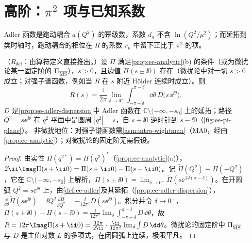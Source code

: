 \section{高阶：$\pi^2$ 项与已知系数}\label{sec:ee-higher}

Adler 函数是跑动耦合 $a(Q^2)$ 的幂级数，系数 $d_n$ 不含 $\ln(Q^2/\mu^2)$；而延拓到类时轴时，跑动耦合的相位在 $R$ 的系数 $r_n$ 中留下正比于 $\pi^2$ 的项。

\begin{proposition}\label{prop:ee-contour}
（$R_{\mathrm{def}}$：由算符定义直接推出。）设 $\Pi$ 满足\cref{prop:ee-analytic}(b) 的条件（或为微扰论某一固定阶的 $\Pi_{\overline{\rm MS}}$），$s>0$，且边值 $\Pi(s\pm\ii0)$ 存在（微扰论中对一切 $s>0$ 成立；对强子谱函数，例如当 $R$ 在 $s$ 附近 Hölder 连续时成立）。则
\begin{equation}\label{eq:ee-contour}
R(s)=\frac1{2\pi}\lim_{\delta\to0^+}\int_{-\pi+\delta}^{\pi-\delta}\!\dd\theta\,D\big(s\,\ee^{\ii\theta}\big),
\end{equation}
$D$ 是\cref{prop:ee-adler-dispersion}中 Adler 函数在 $\mathbb C\setminus(-\infty,-s_0]$ 上的延拓；路径 $Q^2=s\ee^{\ii\theta}$ 在 $q^2$ 平面中是圆周 $|q^2|=s$，自 $s+\ii0$ 逆时针到 $s-\ii0$（\cref{fig:ee-pi-plane}）。
非微扰地位：对强子谱函数需\cref{asm:intro-wightman}（MA0，经由\cref{prop:ee-analytic}）；对微扰论的固定阶无需假设。
\end{proposition}
\begin{proof}
由实性 $\Pi(q^{2*})=\Pi(q^2)^*$（\cref{prop:ee-analytic}(a)），$2\ii\Imag\Pi(s+\ii0)=\Pi(s+\ii0)-\Pi(s-\ii0)$。记 $\tilde\Pi(Q^2)\equiv\Pi(-Q^2)$，它在 $\mathbb C\setminus(-\infty,-s_0]$ 上解析，$\Pi(s\pm\ii0)=\lim_{\delta\to0^+}\tilde\Pi(s\ee^{\mp\ii(\pi-\delta)})$。在开圆弧 $Q^2=s\ee^{\ii\theta}$ 上，由\cref{def:ee-adler}及其延拓（\cref{prop:ee-adler-dispersion}），$\frac{\dd}{\dd\theta}\tilde\Pi(s\ee^{\ii\theta})=\ii Q^2\frac{\dd\tilde\Pi}{\dd Q^2}=-\frac{\ii}{12\pi^2}D(s\ee^{\ii\theta})$。积分并令 $\delta\to0^+$，$\Pi(s+\ii0)-\Pi(s-\ii0)=\frac{\ii}{12\pi^2}\lim_\delta\int_{-\pi+\delta}^{\pi-\delta}D\,\dd\theta$，故 $R=12\pi\Imag\Pi(s+\ii0)=\frac{12\pi}{2\ii}\cdot\frac{\ii}{12\pi^2}\lim_\delta\int D\,\dd\theta$。微扰论的固定阶中 $\Pi_{\overline{\rm MS}}$ 与 $D$ 是主值对数 $L$ 的多项式，在闭圆弧上连续，极限平凡。
\end{proof}



